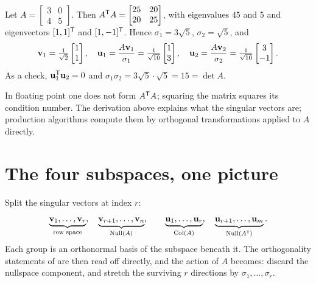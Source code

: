 \begin{example}
Let \(A=\begin{bmatrix}3&0\\4&5\end{bmatrix}\). Then
\(A^{\mathsf{T}} A=\begin{bmatrix}25&20\\20&25\end{bmatrix}\), with eigenvalues \(45\) and
\(5\) and eigenvectors \([1,1]^{\mathsf{T}}\) and \([1,-1]^{\mathsf{T}}\). Hence
\(\sigma_1=3\sqrt5\), \(\sigma_2=\sqrt5\), and
\[
	\mathbf{v}_1=\tfrac{1}{\sqrt2}\begin{bmatrix}1\\1\end{bmatrix},
	\quad
	\mathbf{u}_1=\frac{A\mathbf{v}_1}{\sigma_1}=\tfrac{1}{\sqrt{10}}\begin{bmatrix}1\\3\end{bmatrix},
	\quad
	\mathbf{u}_2=\frac{A\mathbf{v}_2}{\sigma_2}=\tfrac{1}{\sqrt{10}}\begin{bmatrix}3\\-1\end{bmatrix}.
\]
As a check, \(\mathbf{u}_1^{\mathsf{T}}\mathbf{u}_2=0\) and
\(\sigma_1\sigma_2=3\sqrt5\cdot\sqrt5=15=\det A\).
\end{example}

\begin{remark}
In floating point one does not form \(A^{\mathsf{T}} A\); squaring the matrix squares its
condition number. The derivation above explains what the singular vectors are;
production algorithms compute them by orthogonal transformations applied to
\(A\) directly.
\end{remark}

\section{The four subspaces, one picture}

Split the singular vectors at index \(r\):
\[
	\underbrace{\mathbf{v}_1,\ldots,\mathbf{v}_r}_{\text{row space}},\quad
	\underbrace{\mathbf{v}_{r+1},\ldots,\mathbf{v}_n}_{\operatorname{Null}(A)},\qquad
	\underbrace{\mathbf{u}_1,\ldots,\mathbf{u}_r}_{\operatorname{Col}(A)},\quad
	\underbrace{\mathbf{u}_{r+1},\ldots,\mathbf{u}_m}_{\operatorname{Null}(A^{\mathsf{T}})} .
\]
Each group is an orthonormal basis of the subspace beneath it. The orthogonality
statements of  are then read off directly, and the action
of \(A\) becomes: discard the nullspace component, and stretch the surviving
\(r\) directions by \(\sigma_1,\ldots,\sigma_r\).

